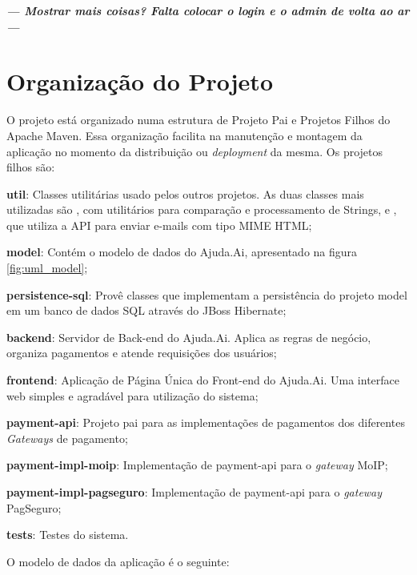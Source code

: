 \textbf{\textit{--- Mostrar mais coisas? Falta colocar o login e o admin de volta ao ar ---}}








\section{Organização do Projeto} \label{sec:ajudaai:organizacao}
O projeto está organizado numa estrutura de Projeto Pai e Projetos Filhos do Apache Maven. Essa organização facilita na manutenção e montagem da aplicação no momento da distribuição ou \emph{deployment} da mesma. Os projetos filhos são:

\begin{lista}
  \item \textbf{util}: Classes utilitárias usado pelos outros projetos. As duas classes mais utilizadas são , com utilitários para comparação e processamento de Strings, e , que utiliza a API  para enviar e-mails com tipo MIME HTML;
  \item \textbf{model}: Contém o modelo de dados do Ajuda.Ai, apresentado na figura \ref{fig:uml_model};
  \item \textbf{persistence-sql}: Provê classes que implementam a persistência do projeto model em um banco de dados SQL através do JBoss Hibernate;
  \item \textbf{backend}: Servidor de Back-end do Ajuda.Ai. Aplica as regras de negócio, organiza pagamentos e atende requisições dos usuários;
  \item \textbf{frontend}: Aplicação de Página Única do Front-end do Ajuda.Ai. Uma interface web simples e agradável para utilização do sistema;
  \item \textbf{payment-api}: Projeto pai para as implementações de pagamentos dos diferentes \emph{Gateways} de pagamento;
  \item \textbf{payment-impl-moip}: Implementação de payment-api para o \emph{gateway} MoIP;
  \item \textbf{payment-impl-pagseguro}: Implementação de payment-api para o \emph{gateway} PagSeguro;
  \item \textbf{tests}: Testes do sistema.
\end{lista}

O modelo de dados da aplicação é o seguinte:

